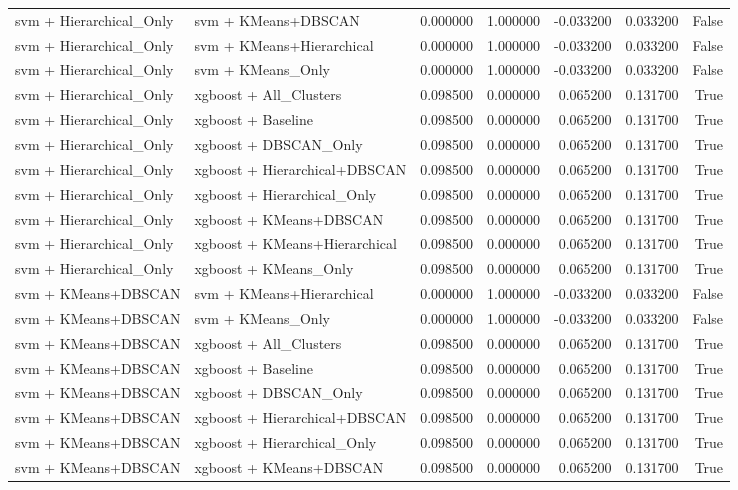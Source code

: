 \begin{tabular}{llrrrrr}
svm + Hierarchical_Only & svm + KMeans+DBSCAN & 0.000000 & 1.000000 & -0.033200 & 0.033200 & False \\
svm + Hierarchical_Only & svm + KMeans+Hierarchical & 0.000000 & 1.000000 & -0.033200 & 0.033200 & False \\
svm + Hierarchical_Only & svm + KMeans_Only & 0.000000 & 1.000000 & -0.033200 & 0.033200 & False \\
svm + Hierarchical_Only & xgboost + All_Clusters & 0.098500 & 0.000000 & 0.065200 & 0.131700 & True \\
svm + Hierarchical_Only & xgboost + Baseline & 0.098500 & 0.000000 & 0.065200 & 0.131700 & True \\
svm + Hierarchical_Only & xgboost + DBSCAN_Only & 0.098500 & 0.000000 & 0.065200 & 0.131700 & True \\
svm + Hierarchical_Only & xgboost + Hierarchical+DBSCAN & 0.098500 & 0.000000 & 0.065200 & 0.131700 & True \\
svm + Hierarchical_Only & xgboost + Hierarchical_Only & 0.098500 & 0.000000 & 0.065200 & 0.131700 & True \\
svm + Hierarchical_Only & xgboost + KMeans+DBSCAN & 0.098500 & 0.000000 & 0.065200 & 0.131700 & True \\
svm + Hierarchical_Only & xgboost + KMeans+Hierarchical & 0.098500 & 0.000000 & 0.065200 & 0.131700 & True \\
svm + Hierarchical_Only & xgboost + KMeans_Only & 0.098500 & 0.000000 & 0.065200 & 0.131700 & True \\
svm + KMeans+DBSCAN & svm + KMeans+Hierarchical & 0.000000 & 1.000000 & -0.033200 & 0.033200 & False \\
svm + KMeans+DBSCAN & svm + KMeans_Only & 0.000000 & 1.000000 & -0.033200 & 0.033200 & False \\
svm + KMeans+DBSCAN & xgboost + All_Clusters & 0.098500 & 0.000000 & 0.065200 & 0.131700 & True \\
svm + KMeans+DBSCAN & xgboost + Baseline & 0.098500 & 0.000000 & 0.065200 & 0.131700 & True \\
svm + KMeans+DBSCAN & xgboost + DBSCAN_Only & 0.098500 & 0.000000 & 0.065200 & 0.131700 & True \\
svm + KMeans+DBSCAN & xgboost + Hierarchical+DBSCAN & 0.098500 & 0.000000 & 0.065200 & 0.131700 & True \\
svm + KMeans+DBSCAN & xgboost + Hierarchical_Only & 0.098500 & 0.000000 & 0.065200 & 0.131700 & True \\
svm + KMeans+DBSCAN & xgboost + KMeans+DBSCAN & 0.098500 & 0.000000 & 0.065200 & 0.131700 & True \\

\end{tabular}
